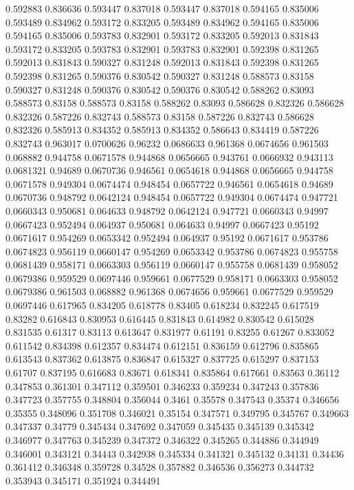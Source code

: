 0.592883 0.836636
0.593447 0.837018
0.593447 0.837018
0.594165 0.835006
0.593489 0.834962
0.593172 0.833205
0.593489 0.834962
0.594165 0.835006
0.594165 0.835006
0.593783 0.832901
0.593172 0.833205
0.592013 0.831843
0.593172 0.833205
0.593783 0.832901
0.593783 0.832901
0.592398 0.831265
0.592013 0.831843
0.590327 0.831248
0.592013 0.831843
0.592398 0.831265
0.592398 0.831265
0.590376 0.830542
0.590327 0.831248
0.588573 0.83158
0.590327 0.831248
0.590376 0.830542
0.590376 0.830542
0.588262 0.83093
0.588573 0.83158
0.588573 0.83158
0.588262 0.83093
0.586628 0.832326
0.586628 0.832326
0.587226 0.832743
0.588573 0.83158
0.587226 0.832743
0.586628 0.832326
0.585913 0.834352
0.585913 0.834352
0.586643 0.834419
0.587226 0.832743
0.963017 0.0700626
0.96232 0.0686633
0.961368 0.0674656
0.961503 0.068882
0.944758 0.0671578
0.944868 0.0656665
0.943761 0.0666932
0.943113 0.0681321
0.94689 0.0670736
0.946561 0.0654618
0.944868 0.0656665
0.944758 0.0671578
0.949304 0.0674474
0.948454 0.0657722
0.946561 0.0654618
0.94689 0.0670736
0.948792 0.0642124
0.948454 0.0657722
0.949304 0.0674474
0.947721 0.0660343
0.950681 0.064633
0.948792 0.0642124
0.947721 0.0660343
0.94997 0.0667423
0.952494 0.064937
0.950681 0.064633
0.94997 0.0667423
0.95192 0.0671617
0.954269 0.0653342
0.952494 0.064937
0.95192 0.0671617
0.953786 0.0674823
0.956119 0.0660147
0.954269 0.0653342
0.953786 0.0674823
0.955758 0.0681439
0.958171 0.0663303
0.956119 0.0660147
0.955758 0.0681439
0.958052 0.0679386
0.959529 0.0697446
0.959661 0.0677529
0.958171 0.0663303
0.958052 0.0679386
0.961503 0.068882
0.961368 0.0674656
0.959661 0.0677529
0.959529 0.0697446
0.617965 0.834205
0.618778 0.83405
0.618234 0.832245
0.617519 0.83282
0.616843 0.830953
0.616445 0.831843
0.614982 0.830542
0.615028 0.831535
0.61317 0.83113
0.613647 0.831977
0.61191 0.83255
0.61267 0.833052
0.611542 0.834398
0.612357 0.834474
0.612151 0.836159
0.612796 0.835865
0.613543 0.837362
0.613875 0.836847
0.615327 0.837725
0.615297 0.837153
0.61707 0.837195
0.616683 0.83671
0.618341 0.835864
0.617661 0.83563
0.36112 0.347853
0.361301 0.347112
0.359501 0.346233
0.359234 0.347243
0.357836 0.347723
0.357755 0.348804
0.356044 0.3461
0.35578 0.347543
0.35374 0.346656
0.35355 0.348096
0.351708 0.346021
0.35154 0.347571
0.349795 0.345767
0.349663 0.347337
0.34779 0.345434
0.347692 0.347059
0.345435 0.345139
0.345342 0.346977
0.347763 0.345239
0.347372 0.346322
0.345265 0.344886
0.344949 0.346001
0.343121 0.34443
0.342938 0.345334
0.341321 0.345132
0.34131 0.34436
0.361412 0.346348
0.359728 0.34528
0.357882 0.346536
0.356273 0.344732
0.353943 0.345171
0.351924 0.344491
